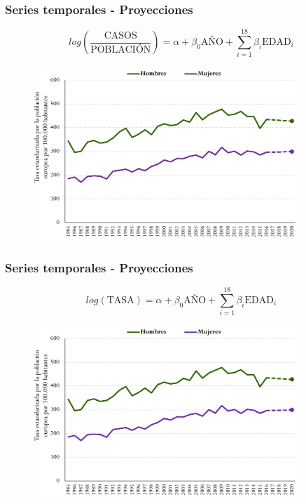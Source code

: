 \documentclass{beamer}
\begin{document}

\begin{frame}\frametitle{Series temporales - Proyecciones}
	\vspace{-20pt}
	\centering
	$$log(\frac{\text{CASOS}}{\text{POBLACIÓN}}) = \alpha + \beta_0 \text{AÑO} + \sum_{i = 1}^{18} \beta_i \text{EDAD}_i $$
	\vspace{-10pt}
	\begin{figure}
		\centering
		\includegraphics[width=0.9\textwidth]{images/proyecciones1.png}
	\end{figure}
\end{frame}


\begin{frame}\frametitle{Series temporales - Proyecciones}
	\vspace{-20pt}
	\centering
	$$log(\text{TASA}) = \alpha + \beta_0 \text{AÑO} + \sum_{i = 1}^{18} \beta_i \text{EDAD}_i $$
	\vspace{-10pt}
	\begin{figure}
		\centering
		\includegraphics[width=0.9\textwidth]{images/proyecciones1.png}
	\end{figure}
\end{frame}
\end{document}
